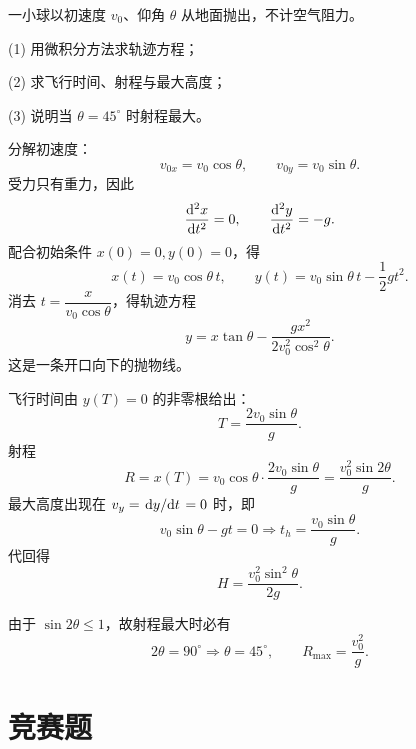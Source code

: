 \begin{classic}
一小球以初速度 $v_0$、仰角 $\theta$ 从地面抛出，不计空气阻力。

(1) 用微积分方法求轨迹方程；

(2) 求飞行时间、射程与最大高度；

(3) 说明当 $\theta=45^\circ$ 时射程最大。

\begin{solution}
分解初速度：
\[
v_{0x}=v_0\cos\theta,
\qquad
v_{0y}=v_0\sin\theta.
\]
受力只有重力，因此
\[
\dv[2]{x}{t}=0,
\qquad
\dv[2]{y}{t}=-g.
\]
配合初始条件 $x(0)=0,y(0)=0$，得
\[
x(t)=v_0\cos\theta\, t,
\qquad
y(t)=v_0\sin\theta\, t-\frac12 gt^2.
\]
消去 $t=\dfrac{x}{v_0\cos\theta}$，得轨迹方程
\[
y=x\tan\theta-\frac{g x^2}{2v_0^2\cos^2\theta}.
\]
这是一条开口向下的抛物线。

\begin{center}
\end{center}

飞行时间由 $y(T)=0$ 的非零根给出：
\[
T=\frac{2v_0\sin\theta}{g}.
\]
射程
\[
R=x(T)=v_0\cos\theta\cdot \frac{2v_0\sin\theta}{g}=\frac{v_0^2\sin2\theta}{g}.
\]
最大高度出现在 $v_y=\dv*{y}{t}=0$ 时，即
\[
v_0\sin\theta-gt=0\Rightarrow t_h=\frac{v_0\sin\theta}{g}.
\]
代回得
\[
H=\frac{v_0^2\sin^2\theta}{2g}.
\]

由于 $\sin2\theta\le 1$，故射程最大时必有
\[
2\theta=90^\circ\Rightarrow \theta=45^\circ,
\qquad
R_{\max}=\frac{v_0^2}{g}.
\]
\end{solution}
\end{classic}

\section*{竞赛题}

